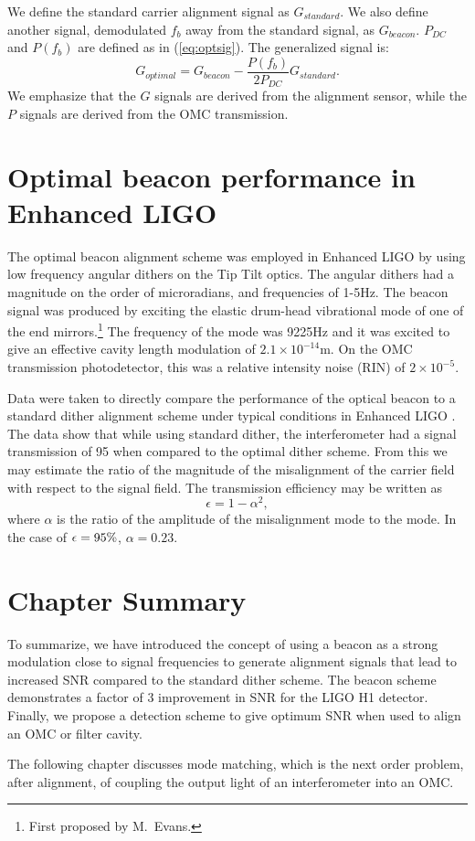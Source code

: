 We define the standard carrier alignment signal as $G_{standard}$. %
We also define another signal, demodulated $f_b$ away from the standard signal, as $G_{beacon}$. %
$P_{DC}$ and $P(f_b)$ are defined as in (\ref{eq:optsig}). %
The generalized signal is:
%
\begin{equation}
G_{optimal} = G_{beacon} - \frac{P(f_b)}{2P_{DC}} G_{standard}.
\end{equation}
%
We emphasize that the $G$ signals are derived from the alignment sensor, while the $P$ signals are derived from the OMC transmission.

\section{Optimal beacon performance in Enhanced LIGO}
The optimal beacon alignment scheme was employed in Enhanced LIGO by using low frequency angular dithers on the Tip Tilt optics. %
The angular dithers had a magnitude on the order of microradians, and frequencies of 1-5Hz. %
The beacon signal was produced by exciting the elastic drum-head vibrational mode of one of the end mirrors.\footnote{First proposed by M.\ Evans.} The frequency of the mode was 9225Hz and it was excited to give an effective cavity length modulation of $2.1\times10^{-14}$m. %
On the OMC transmission photodetector, this was a relative intensity noise (RIN) of $2\times10^{-5}$.

Data were taken to directly compare the performance of the optical beacon to a standard dither alignment scheme under typical conditions in Enhanced LIGO \cite{mattbeaconmeas}. %
The data show that while using standard dither, the interferometer had a signal transmission of 95\perc{} when compared to the optimal dither scheme. %
From this we may estimate the ratio of the magnitude of the misalignment of the carrier field with respect to the signal field. %
The transmission efficiency may be written as
\begin{equation}
\epsilon = 1 - \alpha^2,
\end{equation}
where $\alpha$ is the ratio of the amplitude of the misalignment mode to the  mode. %
In the case of $\epsilon = 95\%{}$, $\alpha = 0.23$.
\section{Chapter Summary}
To summarize, we have introduced the concept of using a beacon as a strong modulation close to signal frequencies to generate alignment signals that lead to increased SNR compared to the standard dither scheme. %
The beacon scheme demonstrates a factor of 3 improvement in SNR for the LIGO H1 detector. %
Finally, we propose a detection scheme to give optimum SNR when used to align an OMC or filter cavity.

The following chapter discusses mode matching, which is the next order problem, after alignment, of coupling the output light of an interferometer into an OMC.